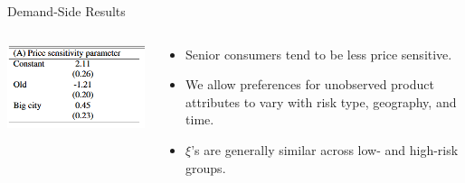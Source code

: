 \documentclass[10pt,aspectratio=169]{beamer}
\begin{document}
\begin{frame}{Demand-Side Results}
    \begin{columns}[T]

        \begin{column}{0.3\textwidth}
          \includegraphics[width=1.2\linewidth]{Figures/Tab2A.png} 
        \end{column}
        
        \begin{column}{0.5\textwidth}
            \begin{itemize}
                \item Senior consumers tend to be less price sensitive.
                \medskip
                \item We allow preferences for unobserved product attributes to vary with risk type, geography, and time.
                \medskip
                \item $\xi$'s are generally similar across low- and high-risk groups.
            \end{itemize}
        \end{column}
    \end{columns}
\end{frame}
\end{document}
